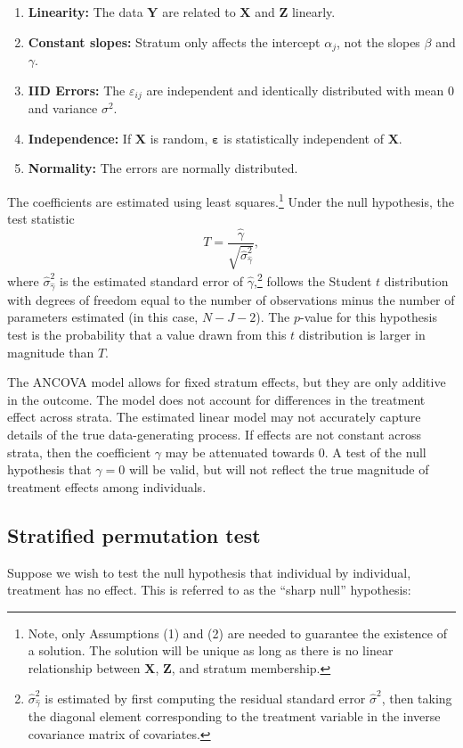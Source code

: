 \documentclass[11pt]{article}
\newcommand{\eps}{\varepsilon}
\begin{document}
\begin{enumerate}
\item \textbf{Linearity:} The data $\mathbf{Y}$ are related to $\mathbf{X}$ and $\mathbf{Z}$ linearly.
\item \textbf{Constant slopes:} Stratum only affects the intercept $\alpha_j$, not the slopes $\beta$ and $\gamma$.
\item \textbf{IID Errors:} The $\eps_{ij}$ are independent and identically distributed with mean $0$ and variance $\sigma^2$.
\item \textbf{Independence:} If $\mathbf{X}$ is random, $\mathbf{\varepsilon}$ is statistically independent of $\mathbf{X}$.
\item \textbf{Normality:} The errors are normally distributed.
\end{enumerate}

The coefficients are estimated using least squares.\footnote{
Note, only Assumptions (1) and (2) are needed to guarantee the existence of a solution.
The solution will be unique as long as there is no linear relationship between $\mathbf{X}$, $\mathbf{Z}$, and stratum membership.
}
Under the null hypothesis, the test statistic 
$$ T = \frac{\hat{\gamma}}{\sqrt{ \hat{\sigma}_{\hat{\gamma}}^2}},$$
where $\hat{\sigma}_{\hat{\gamma}}^2$ is the estimated standard error of $\hat{\gamma}$,\footnote{
$\hat{\sigma}_{\hat{\gamma}}^2$ is estimated by first computing the residual standard error $\hat{\sigma}^2$,
then taking the diagonal element corresponding to the treatment variable in the inverse covariance matrix of covariates.
}
follows the Student $t$ distribution with degrees of freedom equal to the number of observations minus the number of parameters estimated (in this case, $N - J - 2$).
The $p$-value for this hypothesis test is the probability that a value drawn from this $t$ distribution is larger in magnitude than $T$.


The ANCOVA model allows for fixed stratum effects, but they are only additive in the outcome.  
The model does not account for differences in the treatment effect across strata.  
The estimated linear model may not accurately capture details of the true data-generating process.  
If effects are not constant across strata, then the coefficient $\gamma$ may be attenuated towards 0.  
A test of the null hypothesis that $\gamma = 0$ will be valid, but will not reflect the true magnitude of treatment effects among individuals.

\subsection*{Stratified permutation test}
Suppose we wish to test the null hypothesis that individual by individual, treatment has no effect.
This is referred to as the ``sharp null'' hypothesis:
\end{document}
